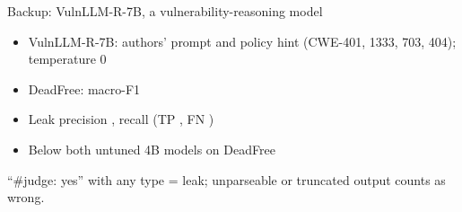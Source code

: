 \begin{frame}{Backup: VulnLLM-R-7B, a vulnerability-reasoning model}
  \begin{itemize}
    \item VulnLLM-R-7B: authors' prompt and policy hint (CWE-401, 1333, 703, 404); temperature 0
    \item DeadFree: macro-F1  
    \item Leak precision , recall  (TP , FN )
    \item Below both untuned 4B models on DeadFree
  \end{itemize}
  \vfill
  {\scriptsize ``\#judge: yes'' with any type = leak; unparseable or truncated output counts as wrong.\par}
\end{frame}

